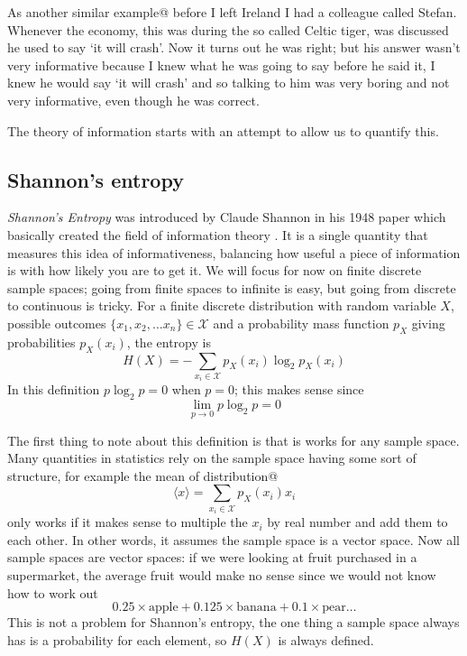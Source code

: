 \documentclass[12pt]{article}
\begin{document}
As another similar example@ before I left Ireland I had a colleague
called Stefan. Whenever the economy, this was during the so called
Celtic tiger, was discussed he used to say \lq{}it will
crash\rq{}. Now it turns out he was right; but his answer wasn't very
informative because I knew what he was going to say before he said it,
I knew he would say \lq{}it will crash\rq{} and so talking to him was
very boring and not very informative, even though he was correct.

The theory of information starts with an attempt to allow us to
quantify this. 

\subsection*{Shannon's entropy}


\textsl{Shannon's Entropy} was introduced by Claude Shannon in his
1948 paper which basically created the field of information theory
\citep{Shannon1948}. It is a single quantity that measures this idea of
informativeness, balancing how useful a piece of information is with
how likely you are to get it. We will focus for now on finite discrete
sample spaces; going from finite spaces to infinite is easy, but going
from discrete to continuous is tricky. For a finite discrete
distribution with random variable $X$, possible outcomes
$\{x_1,x_2,\ldots x_n\}\in\mathcal{X}$ and a probability mass function
$p_X$ giving probabilities $p_X(x_i)$, the entropy is
\begin{equation}
H(X)=-\sum_{x_i\in \mathcal{X}}{p_X(x_i)\log_2p_X(x_i)}
\end{equation}
In this definition $p\log_2{p}=0$ when $p=0$; this makes sense since
\begin{equation}
\lim_{p\rightarrow 0}p\log_2{p}=0
\end{equation}


The first thing to note about this definition is that is works for any
sample space. Many quantities in statistics rely on the sample space
having some sort of structure, for example the mean of distribution@
\begin{equation}
\langle x\rangle = \sum_{x_i\in \mathcal{X}}{p_X(x_i)x_i}
\end{equation}
only works if it makes sense to multiple the $x_i$ by real number and
add them to each other. In other words, it assumes the sample space is
a vector space. Now all sample spaces are vector spaces: if we were
looking at fruit purchased in a supermarket, the average fruit would
make no sense since we would not know how to work out
\begin{equation}
0.25\times \mbox{apple}+0.125\times \mbox{banana}+0.1\times \mbox{pear}\ldots
\end{equation}
This is not a problem for Shannon's entropy, the one
thing a sample space always has is a probability for each element, so
$H(X)$ is always defined.
\end{document}
